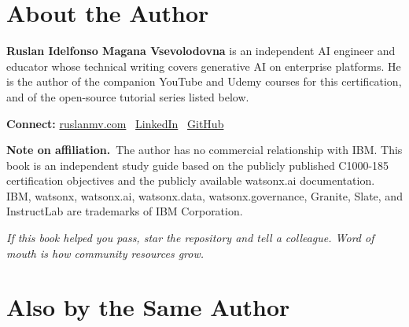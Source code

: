 \chapter*{About the Author}

\noindent\textbf{Ruslan Idelfonso Magana Vsevolodovna} is an independent AI engineer and educator whose technical writing covers generative AI on enterprise platforms. He is the author of the companion YouTube and Udemy courses for this certification, and of the open-source tutorial series listed below.

\medskip

\noindent\textbf{Connect:}
\href{https://ruslanmv.com}{ruslanmv.com} \textbullet\
\href{https://www.linkedin.com/in/ruslanmv/}{LinkedIn} \textbullet\
\href{https://github.com/ruslanmv}{GitHub}

\medskip

\noindent\textbf{Note on affiliation.}\ The author has no commercial relationship with IBM. This book is an independent study guide based on the publicly published C1000-185 certification objectives and the publicly available watsonx.ai documentation. IBM, watsonx, watsonx.ai, watsonx.data, watsonx.governance, Granite, Slate, and InstructLab are trademarks of IBM Corporation.

\medskip

\noindent\textit{If this book helped you pass, star the repository and tell a colleague. Word of mouth is how community resources grow.}

\cleardoublepage


\chapter*{Also by the Same Author}

